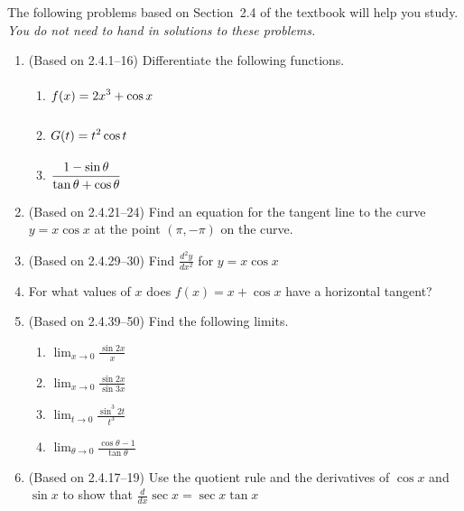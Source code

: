 \documentclass{article}
\title{\commonPSTitleZeroTwoFour}
\author{\commonAuthor}
\date{\commonDateZeroTwoFour}
\newcommand{\ds}{\displaystyle}
\begin{document}
\maketitle
\thispagestyle{empty}

\noindent
The following problems based on Section~2.4 of the textbook will help
you study.  \emph{You do not need to hand in solutions to these
  problems.}
\begin{enumerate}
\item (Based on 2.4.1--16) %
  Differentiate the following functions.
  \begin{multicols}{3}
  \begin{enumerate}
  \item %
    $\ds \vphantom{\frac{\theta}{\theta}} f(x)=2x^3+\cos x$
  \item %
    $\ds \vphantom{\frac{\theta}{\theta}} G(t)=t^2 \cos t$
  \item %
    $\ds \vphantom{\frac{\theta}{\theta}} 
    \frac{1-\sin\theta}{\tan\theta + \cos\theta}$
  \end{enumerate}
  \end{multicols}
\item (Based on 2.4.21--24) %
  Find an equation for the tangent line to the curve $y=x\cos x$
  at the point $(\pi,-\pi)$ on the curve.
\item (Based on 2.4.29--30) %
  Find $\ds \frac{d^2y}{dx^2}$ for $y=x\cos x$
\item %
  For what values of $x$ does $f(x)=x+\cos x$ have a horizontal
  tangent? 
\item (Based on 2.4.39--50) %
  Find the following limits.
  \begin{multicols}{4}
  \begin{enumerate}
  \item %
    $\ds \lim_{x\to 0} \frac{\sin 2x}{x}$
  \item %
    $\ds \lim_{x\to 0} \frac{\sin 2x}{\sin 3x}$
  \item %
    $\ds \lim_{t\to 0} \frac{\sin^3 2t}{t^3}$
  \item %
    $\ds \lim_{\theta\to 0} \frac{\cos\theta -1}{\tan\theta}$
  \end{enumerate}
  \end{multicols}
\item (Based on 2.4.17--19) %
  Use the quotient rule and the derivatives of $\cos x$ and $\sin
  x$ to show that $\ds \frac{d}{dx} \sec x = \sec x \tan x$

\end{enumerate}
\end{document}
